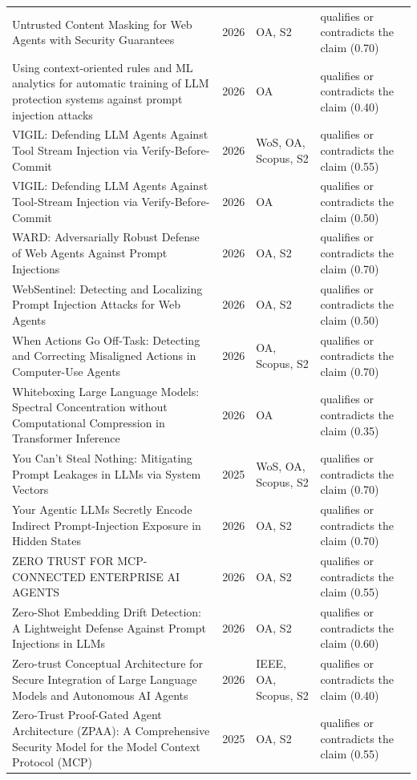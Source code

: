 \begin{longtable}{@{}%
  >{\raggedright\arraybackslash}p{}c%
  >{\raggedright\arraybackslash}p{}%
  >{\raggedright\arraybackslash}p{}@{}}
Untrusted Content Masking for Web Agents with Security Guarantees & 2026 & OA, S2 & qualifies or contradicts the claim (0.70) \\
Using context-oriented rules and ML analytics for automatic training of LLM protection systems against prompt injection attacks & 2026 & OA & qualifies or contradicts the claim (0.40) \\
VIGIL: Defending LLM Agents Against Tool Stream Injection via Verify-Before-Commit & 2026 & WoS, OA, Scopus, S2 & qualifies or contradicts the claim (0.55) \\
VIGIL: Defending LLM Agents Against Tool-Stream Injection via Verify-Before-Commit & 2026 & OA & qualifies or contradicts the claim (0.50) \\
WARD: Adversarially Robust Defense of Web Agents Against Prompt Injections & 2026 & OA, S2 & qualifies or contradicts the claim (0.70) \\
WebSentinel: Detecting and Localizing Prompt Injection Attacks for Web Agents & 2026 & OA, S2 & qualifies or contradicts the claim (0.50) \\
When Actions Go Off-Task: Detecting and Correcting Misaligned Actions in Computer-Use Agents & 2026 & OA, Scopus, S2 & qualifies or contradicts the claim (0.70) \\
Whiteboxing Large Language Models: Spectral Concentration without Computational Compression in Transformer Inference & 2026 & OA & qualifies or contradicts the claim (0.35) \\
You Can't Steal Nothing: Mitigating Prompt Leakages in LLMs via System Vectors & 2025 & WoS, OA, Scopus, S2 & qualifies or contradicts the claim (0.70) \\
Your Agentic LLMs Secretly Encode Indirect Prompt-Injection Exposure in Hidden States & 2026 & OA, S2 & qualifies or contradicts the claim (0.70) \\
ZERO TRUST FOR MCP-CONNECTED ENTERPRISE AI AGENTS & 2026 & OA, S2 & qualifies or contradicts the claim (0.55) \\
Zero-Shot Embedding Drift Detection: A Lightweight Defense Against Prompt Injections in LLMs & 2026 & OA, S2 & qualifies or contradicts the claim (0.60) \\
Zero-trust Conceptual Architecture for Secure Integration of Large Language Models and Autonomous AI Agents & 2026 & IEEE, OA, Scopus, S2 & qualifies or contradicts the claim (0.40) \\
Zero-Trust Proof-Gated Agent Architecture (ZPAA): A Comprehensive Security Model for the Model Context Protocol (MCP) & 2025 & OA, S2 & qualifies or contradicts the claim (0.55) \\
\end{longtable}
\endgroup
